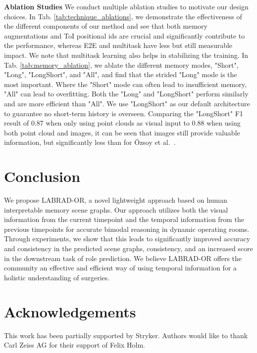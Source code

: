 \documentclass[runningheads]{llncs}
\begin{document}
\noindent\textbf{Ablation Studies}
We conduct multiple ablation studies to motivate our design choices. In Tab. \ref{tab:technique_ablations}, we demonstrate the effectiveness of the different components of our method and see that both memory augmentations and ToI positional ids are crucial and significantly contribute to the performance, whereas E2E and multitask have less but still measurable impact. We note that multitask learning also helps in stabilizing the training. In Tab. \ref{tab:memory_ablation}, we ablate the different memory modes, "Short", "Long", "LongShort", and "All", and find that the strided "Long" mode is the most important. Where the "Short" mode can often lead to insufficient memory, "All" can lead to overfitting. Both the "Long" and "LongShort" perform similarly and are more efficient than "All". We use "LongShort" as our default architecture to guarantee no short-term history is overseen.
Comparing the "LongShort" F1 result of 0.87 when only using point clouds as visual input to 0.88 when using both point cloud and images, it can be seen that images still provide valuable information, but significantly less than for Özsoy et al.~\cite{ozsoy20224d}.

\section{Conclusion}
We propose LABRAD-OR, a novel lightweight approach based on human interpretable memory scene graphs. Our approach utilizes both the visual information from the current timepoint and the temporal information from the previous timepoints for accurate bimodal reasoning in dynamic operating rooms. Through experiments, we show that this leads to significantly improved accuracy and consistency in the predicted scene graphs, consistency, and an increased score in the downstream task of role prediction. We believe LABRAD-OR offers the community an effective and efficient way of using temporal information for a holistic understanding of surgeries.\

\section{Acknowledgements}
This work has been partially supported by Stryker. Authors would like to thank Carl Zeiss AG for their support of Felix Holm.



\end{document}
